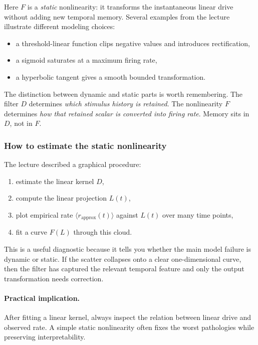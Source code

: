Here $F$ is a \emph{static} nonlinearity: it transforms the instantaneous linear drive without adding new temporal memory. Several examples from the lecture illustrate different modeling choices:
\begin{itemize}
    \item a threshold-linear function clips negative values and introduces rectification,
    \item a sigmoid saturates at a maximum firing rate,
    \item a hyperbolic tangent gives a smooth bounded transformation.
\end{itemize}

The distinction between dynamic and static parts is worth remembering. The filter $D$ determines \emph{which stimulus history is retained}. The nonlinearity $F$ determines \emph{how that retained scalar is converted into firing rate}. Memory sits in $D$, not in $F$.

\subsubsection{How to estimate the static nonlinearity}

The lecture described a graphical procedure:
\begin{enumerate}
    \item estimate the linear kernel $D$,
    \item compute the linear projection $L(t)$,
    \item plot empirical rate $\langle r_{\mathrm{approx}}(t)\rangle$ against $L(t)$ over many time points,
    \item fit a curve $F(L)$ through this cloud.
\end{enumerate}

This is a useful diagnostic because it tells you whether the main model failure is dynamic or static. If the scatter collapses onto a clear one-dimensional curve, then the filter has captured the relevant temporal feature and only the output transformation needs correction.

\paragraph{Practical implication.}
After fitting a linear kernel, always inspect the relation between linear drive and observed rate. A simple static nonlinearity often fixes the worst pathologies while preserving interpretability.

